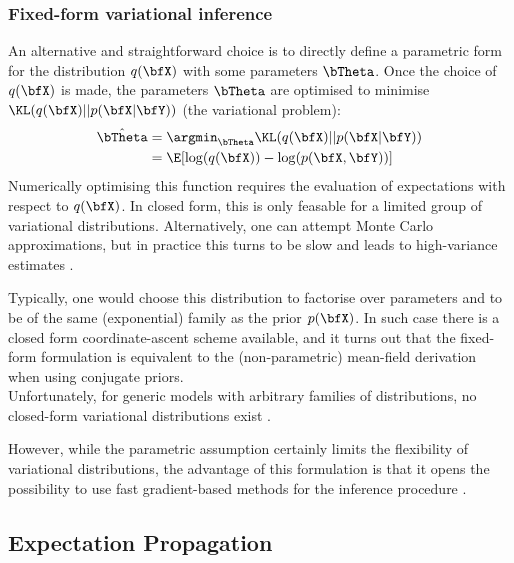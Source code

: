 \subsubsection{Fixed-form variational inference}  \label{section:fixed_form}

An alternative and straightforward choice is to directly define a parametric form for the distribution $q(\bfX)$ with some parameters $\bTheta$. Once the choice of $q(\bfX)$ is made, the parameters $\bTheta$ are optimised to minimise $\KL(q(\bfX)||p(\bfX|\bfY))$ (the variational problem):
\begin{align}
	\hat{\bTheta} &= \argmin_{\bTheta} \KL(q(\bfX)||p(\bfX|\bfY)) \\
	&= \E[\log(q(\bfX)) - \log(p(\bfX,\bfY))]
\end{align}
Numerically optimising this function requires the evaluation of expectations with respect to $q(\bfX)$. In closed form, this is only feasable for a limited group of variational distributions. Alternatively, one can attempt Monte Carlo approximations, but in practice this turns to be slow and leads to high-variance estimates \cite{Braun2007,Ranganath2014,Braun2007}.

Typically, one would choose this distribution to factorise over parameters and to be of the same (exponential) family as the prior $p(\bfX)$. In such case there is a closed form coordinate-ascent scheme available, and it turns out that the fixed-form formulation is equivalent to the (non-parametric) mean-field derivation when using conjugate priors.\\
Unfortunately, for generic models with arbitrary families of distributions, no closed-form variational distributions exist \cite{Zhang2017,Blei2016}. 

However, while the parametric assumption certainly limits the flexibility of variational distributions, the advantage of this formulation is that it opens the possibility to use fast gradient-based methods for the inference procedure \cite{Hoffman2012,Ranganath2014}.


\subsection{Expectation Propagation}  \label{section:expectation_propagation}

